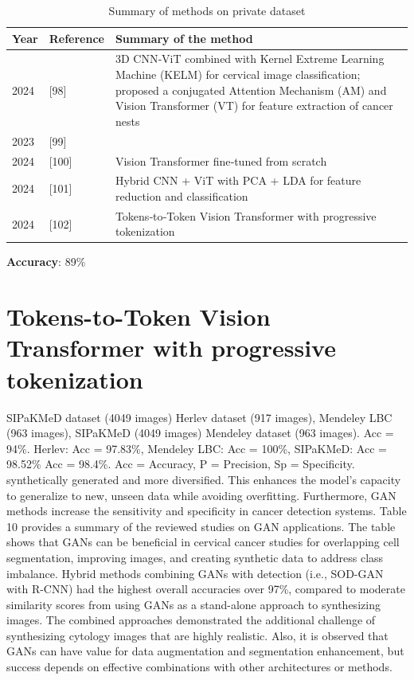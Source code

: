 \documentclass{svjour3}
\begin{document}
\begin{table}[htbp]
\centering
\caption{Summary of methods on private dataset}
\label{tab:summary}
\begin{tabular}{lll}
\hline
Year & Reference & Summary of the method \\
\hline
2024 & [98] & 3D CNN‑ViT combined with Kernel Extreme Learning Machine (KELM) for cervical image classification; proposed a conjugated Attention Mechanism (AM) and Vision Transformer (VT) for feature extraction of cancer nests \\
2023 & [99] & \\
2024 & [100] & Vision Transformer fine‑tuned from scratch \\
2024 & [101] & Hybrid CNN + ViT with PCA + LDA for feature reduction and classification \\
2024 & [102] & Tokens‑to‑Token Vision Transformer with progressive tokenization \\
\hline
\end{tabular}
\end{table}
\textbf{Accuracy}: 89\%

\section{Tokens-to-Token Vision Transformer with progressive tokenization}
SIPaKMeD dataset (4049 images) Herlev dataset (917 images), Mendeley LBC (963 images), SIPaKMeD (4049 images) Mendeley dataset (963 images).
Acc = 94\%.
Herlev: Acc = 97.83\%, Mendeley LBC: Acc = 100\%, SIPaKMeD: Acc = 98.52\% Acc = 98.4\%.
Acc = Accuracy, P = Precision, Sp = Specificity.
synthetically generated and more diversified. This enhances the model’s capacity to generalize to new, unseen data while avoiding overfitting. Furthermore, GAN methods increase the sensitivity and specificity in cancer detection systems. Table 10 provides a summary of the reviewed studies on GAN applications.
The table shows that GANs can be beneficial in cervical cancer studies for overlapping cell segmentation, improving images, and creating synthetic data to address class imbalance. Hybrid methods combining GANs with detection (i.e., SOD-GAN with R-CNN) had the highest overall accuracies over 97\%, compared to moderate similarity scores from using GANs as a stand-alone approach to synthesizing images. The combined approaches demonstrated the additional challenge of synthesizing cytology images that are highly realistic. Also, it is observed that GANs can have value for data augmentation and segmentation enhancement, but success depends on effective combinations with other architectures or methods.
\end{document}
